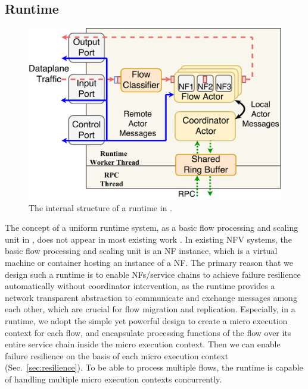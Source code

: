 
\subsection{Runtime}
\label{sec:runtime}

\begin{figure}
		\centering
		\includegraphics[width=\columnwidth]{figure/new-nfactor-runtime-arch.pdf}

		\caption{The internal structure of a runtime in \nfactor.}
\label{fig:runtime-arch}
\end{figure}

The concept of a uniform runtime system, as a basic flow processing and scaling unit in \nfactor, does not appear in most existing work \cite{bremler2015openbox, gember2012stratos, palkar2015e2}. In existing NFV systems, the basic flow processing and scaling unit is an NF instance, which is a virtual machine or container hosting an instance of a NF. %
 The primary reason that we design such a runtime is to enable NFs/service chains to achieve failure resilience automatically without coordinator intervention, as the runtime provides a network transparent abstraction  to communicate and exchange messages among each other, which are crucial for flow migration and replication. 
  Especially, in a runtime, we adopt the simple yet powerful design to create a micro execution context for each flow, and encapsulate processing functions of the flow over its entire service chain inside the micro execution context. Then we can enable failure resilience on the basis of each micro execution context (Sec.~\ref{sec:resilience}). To be able to process multiple flows, the runtime is capable of handling multiple micro execution contexts concurrently. 


